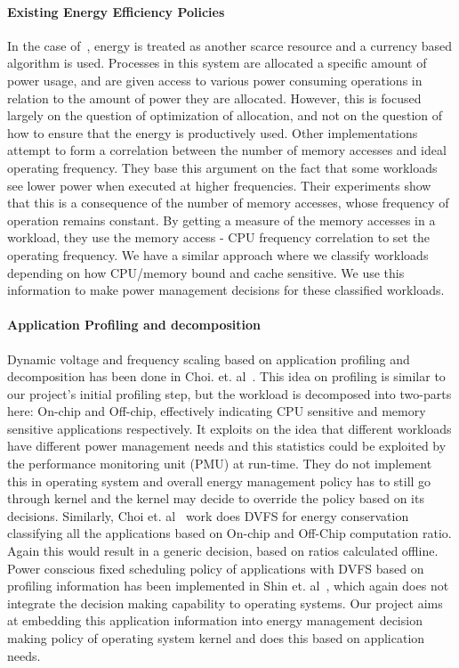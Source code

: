 \paragraph{Existing Energy Efficiency Policies} In the case of~\cite{ecos}, energy is treated as another scarce resource and a currency based algorithm is used. 
Processes in this system are allocated a specific amount of power usage, and are given access to various power consuming operations in relation to the amount 
of power they are allocated. However, this is focused largely on the question of optimization of allocation, and not on the question of how to ensure that the energy is productively used.
Other implementations~\cite{and-dvfs, decomp} attempt to form a correlation between the number of memory accesses and ideal operating frequency. They base this 
argument on the fact that some workloads see lower power when executed at higher frequencies. Their experiments show that this is a consequence of the 
number of memory accesses, whose frequency of operation remains constant. By getting a measure of the memory accesses in a workload, 
they use the memory access - CPU frequency correlation to set the operating frequency.
We have a similar approach where we classify workloads depending on how CPU/memory bound and cache sensitive. 
We use this information to make power management decisions for these classified workloads. 

\paragraph{Application Profiling and decomposition} Dynamic voltage and frequency scaling based on application profiling and 
decomposition has been done in Choi. et. al~\cite{decomp}. This idea on profiling is similar to our project’s initial profiling step, but the workload 
is decomposed into two-parts here: On-chip and Off-chip, effectively indicating CPU sensitive and memory sensitive applications respectively. 
It exploits on the idea that different workloads have different power management needs and this statistics could be exploited by the performance 
monitoring unit (PMU) at run-time. They do not implement this in operating system and  overall energy management policy has to still go through kernel 
and the kernel may decide to override the policy based on its decisions. Similarly, Choi et. al~\cite{choi2005fine} work does DVFS for energy conservation 
classifying all the applications based on On-chip and Off-Chip computation ratio. Again this would result in a generic decision, based on ratios calculated offline. 
Power conscious fixed scheduling policy of applications with DVFS based on profiling information has been implemented in Shin et. al~\cite{shin1999power}, 
which again does not integrate the decision making capability to operating systems. Our project aims at embedding this application information 
into energy management decision making policy of operating system kernel and does this based on application needs. 
